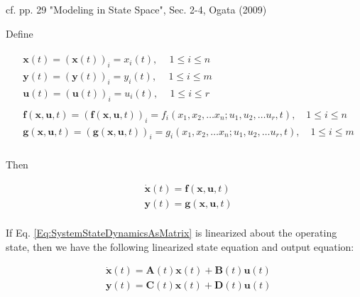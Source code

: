 \documentclass[10pt]{amsart}
\begin{document}
\begin{multicols*}{2}
cf. pp. 29 "Modeling in State Space", Sec. 2-4, Ogata (2009) \cite{Ogat2009}

Define 

\begin{equation}
\begin{gathered}
	\begin{aligned}
		& \mathbf{x}(t) = (\mathbf{x}(t))_i  = x_i(t), \quad \, 1 \leq i \leq n \\
		& \mathbf{y}(t) = (\mathbf{y}(t))_i = y_i(t), \quad \, 1 \leq i \leq m \\
		& \mathbf{u}(t) = (\mathbf{u}(t))_i = u_i(t) , \quad \, 1 \leq i \leq r 
	\end{aligned} \\
	\begin{aligned}
		& \mathbf{f}(\mathbf{x}, \mathbf{u}, t) = (\mathbf{f}(\mathbf{x}, \mathbf{u}, t))_i  = f_i (x_1, x_2, \dots x_n; u_1, u_2, \dots u_r, t), \quad  1 \leq i \leq n \\
		& \mathbf{g}(\mathbf{x}, \mathbf{u}, t) = (\mathbf{g}(\mathbf{x}, \mathbf{u}, t))_i  = g_i (x_1, x_2, \dots x_n; u_1, u_2, \dots u_r, t), \quad  1 \leq i \leq m \\
	\end{aligned}
\end{gathered}
\end{equation}

Then

\begin{equation}\label{Eq:SystemStateDynamicsAsMatrix}
\begin{aligned}
& \dot{\mathbf{x}}(t) = \mathbf{f}(\mathbf{x}, \mathbf{u}, t) \\
& \mathbf{y}(t) = \mathbf{g}(\mathbf{x}, \mathbf{u}, t) \\
\end{aligned}
\end{equation}

If Eq. \ref{Eq:SystemStateDynamicsAsMatrix} is linearized about the operating state, then we have the following linearized state equation and output equation:

\begin{equation}
\begin{aligned}
& \dot{\mathbf{x}}(t) = \mathbf{A}(t) \mathbf{x}(t) + \mathbf{B}(t) \mathbf{u}(t) \\
& \mathbf{y}(t) = \mathbf{C}(t) \mathbf{x}(t) + \mathbf{D}(t) \mathbf{u}(t) \\
\end{aligned}
\end{equation}


\end{multicols*}
\end{document}
